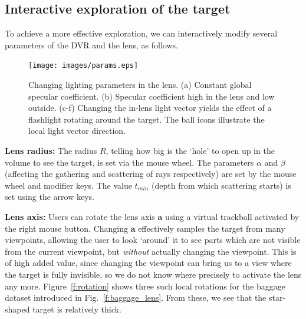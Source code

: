 \vspace{-0.15cm}
\subsection{Interactive exploration of the target}
\label{sec:inter_expl}
%
To achieve a more effective exploration, we can interactively modify several parameters of the DVR and the lens, as follows.
%
\begin{figure}[htbp]
\centering
\vspace{-0.15cm}
\texttt{[image: images/params.eps]}
\vspace{-0.15cm}
\caption{Changing lighting parameters in the lens. (a) Constant global specular coefficient. (b) Specular coefficient high in the lens and low outside. (c-f) Changing the in-lens light vector yields the effect of a flashlight rotating around the target. The ball icons illustrate the local light vector direction.}
\label{f:params}
\vspace{-0.15cm}
\end{figure}
%


\vspace{0.2cm}
\noindent\textbf{Lens radius:} The radius $R$, telling how big is the `hole' to open up in the volume to see the target, is set via the mouse wheel. The parameters $\alpha$ and $\beta$ (affecting the gathering and scattering of rays respectively) are set by the mouse wheel and modifier keys. The value $t_{min}$ (depth from which scattering starts) is set using the arrow keys.

\vspace{0.2cm}
\noindent\textbf{Lens axis:} Users can rotate the lens axis $\mathbf{a}$ using a virtual trackball activated by the right mouse button. Changing $\mathbf{a}$ effectively samples the target from many viewpoints, allowing the user to look `around' it to see parts which are not visible from the current viewpoint, but \emph{without} actually changing the viewpoint. This is of high added value, since changing the viewpoint can bring us to a view where the target is fully invisible, so we do not know where precisely to activate the lens any more. Figure~\ref{f:rotation} shows three such local rotations for the baggage dataset introduced in Fig.~\ref{f:baggage_lens}. From these, we see that the star-shaped target is relatively thick.

